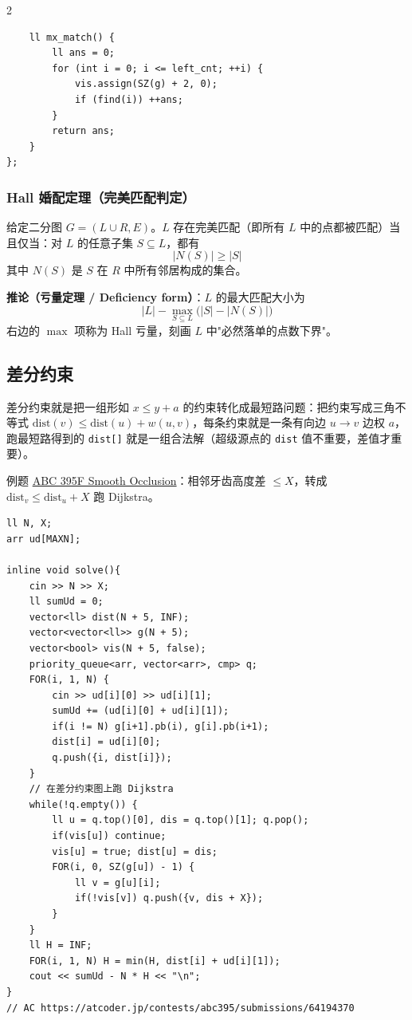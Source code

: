 \begin{multicols*}{2}
\begin{verbatim}
    ll mx_match() {
        ll ans = 0;
        for (int i = 0; i <= left_cnt; ++i) {
            vis.assign(SZ(g) + 2, 0);
            if (find(i)) ++ans;
        }
        return ans;
    }
};
		\end{verbatim}

		\subsubsection{Hall 婚配定理（完美匹配判定）}

		给定二分图 $G = (L \cup R, E)$。$L$ 存在完美匹配（即所有 $L$ 中的点都被匹配）当且仅当：对 $L$ 的任意子集 $S \subseteq L$，都有
		$$|N(S)| \ge |S|$$
		其中 $N(S)$ 是 $S$ 在 $R$ 中所有邻居构成的集合。

		\textbf{推论（亏量定理 / Deficiency form）}：$L$ 的最大匹配大小为
		$$|L| - \max_{S \subseteq L} \bigl(|S| - |N(S)|\bigr)$$
		右边的 $\max$ 项称为 Hall 亏量，刻画 $L$ 中"必然落单的点数下界"。


		\subsection{差分约束}

		差分约束就是把一组形如 $x \leq y + a$ 的约束转化成最短路问题：把约束写成三角不等式 $\mathrm{dist}(v) \leq \mathrm{dist}(u) + w(u, v)$，每条约束就是一条有向边 $u \to v$ 边权 $a$，跑最短路得到的 \texttt{dist[]} 就是一组合法解（超级源点的 \texttt{dist} 值不重要，差值才重要）。

		例题 \href{https://atcoder.jp/contests/abc395/tasks/abc395_f}{ABC 395F Smooth Occlusion}：相邻牙齿高度差 $\leq X$，转成 $\mathrm{dist}_v \leq \mathrm{dist}_u + X$ 跑 Dijkstra。

		\begin{verbatim}
ll N, X;
arr ud[MAXN];

inline void solve(){
    cin >> N >> X;
    ll sumUd = 0;
    vector<ll> dist(N + 5, INF);
    vector<vector<ll>> g(N + 5);
    vector<bool> vis(N + 5, false);
    priority_queue<arr, vector<arr>, cmp> q;
    FOR(i, 1, N) {
        cin >> ud[i][0] >> ud[i][1];
        sumUd += (ud[i][0] + ud[i][1]);
        if(i != N) g[i+1].pb(i), g[i].pb(i+1);
        dist[i] = ud[i][0];
        q.push({i, dist[i]});
    }
    // 在差分约束图上跑 Dijkstra
    while(!q.empty()) {
        ll u = q.top()[0], dis = q.top()[1]; q.pop();
        if(vis[u]) continue;
        vis[u] = true; dist[u] = dis;
        FOR(i, 0, SZ(g[u]) - 1) {
            ll v = g[u][i];
            if(!vis[v]) q.push({v, dis + X});
        }
    }
    ll H = INF;
    FOR(i, 1, N) H = min(H, dist[i] + ud[i][1]);
    cout << sumUd - N * H << "\n";
}
// AC https://atcoder.jp/contests/abc395/submissions/64194370
		\end{verbatim}


\end{multicols*}
